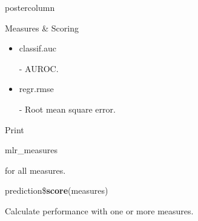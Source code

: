\documentclass{beamer}
\newcommand{\codeinline}[1]{\begin{codeboxinline}#1\end{codeboxinline}}
\begin{document}
\begin{frame}[fragile]{}
\begin{columns}
\begin{column}{.245\textwidth}
\begin{beamercolorbox}[center]{postercolumn}
\begin{minipage}{.98\textwidth}
{\begin{myblock}{Measures \& Scoring}
\begin{itemize}
								\item \codeinline{classif.auc} - AUROC.
								\item \codeinline{regr.rmse} - Root mean square error.
							\end{itemize}
							\vspace{1em}
							Print \codeinline{mlr\_measures} for all measures.
							\\
							\begin{codebox}
								prediction\$\textbf{score}(measures)
							\end{codebox}
							Calculate performance with one or more measures.
						\end{myblock}
						\vfill}
				\end{minipage}
			\end{beamercolorbox}
		\end{column}
	\end{columns}
\end{frame}
\end{document}

